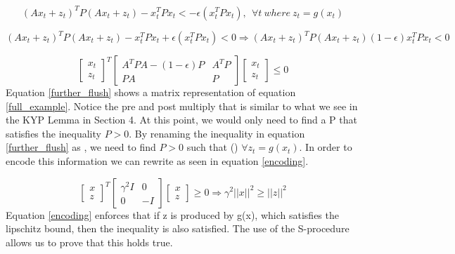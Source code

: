 \documentclass{article}[12pt]
\def\eps{\epsilon}
\begin{document}
\begin{equation}
    \label{init_example}
    (A x_t + z_t)^T P (A x_t + z_t) - x_t^T P x_t < -\eps(x_t^T P x_t) , \: \: \forall t \: where \: z_t = g(x_t) 
\end{equation}

\begin{equation}
 \label{full_example}
    (A x_t + z_t)^T P (A x_t + z_t) - x_t^T P x_t +\eps(x_t^T P x_t) < 0 \Rightarrow  (A x_t + z_t)^T P (A x_t + z_t) (1-\eps) x_t^T P x_t < 0
\end{equation}
    
    
    
\begin{equation}
    \label{further_flush}
    \begin{bmatrix}
    x_t \\ z_t
    \end{bmatrix}^T 
    \begin{bmatrix}
        A^{T}PA - (1-\eps)P & A^T P \\
         PA &P
    \end{bmatrix}  
    \begin{bmatrix}
    x_t \\
    z_t
    \end{bmatrix}
    \leq 0
\end{equation}
Equation \ref{further_flush} shows a matrix representation of equation \ref{full_example}. Notice the pre and post multiply that is similar to what we see in the KYP Lemma in Section 4. At this point, we would only need to find a P that satisfies the inequality $P > 0$. By renaming the inequality in equation \ref{further_flush} as \boldsymbol{*}, we need to find $P>0$ such that (\boldsymbol{*}) $\forall z_t = g(x_t)$. In order to encode this information we can rewrite as seen in equation \ref{encoding}.

\begin{equation}
    \label{encoding}
    \begin{bmatrix}
    x \\ z
    \end{bmatrix}^T 
    \begin{bmatrix}
        \gamma^2 I & 0 \\
         0 &-I
    \end{bmatrix}  
    \begin{bmatrix}
    x \\
    z
    \end{bmatrix}
    \geq 0
    \Rightarrow
    \gamma^2 ||x||^2 \geq ||z||^2
\end{equation}
Equation \ref{encoding} enforces that if z is produced by g(x), which satisfies the lipschitz bound, then the inequality \boldsymbol{*} is also satisfied. The use of the S-procedure allows us to prove that this holds true.
\end{document}
